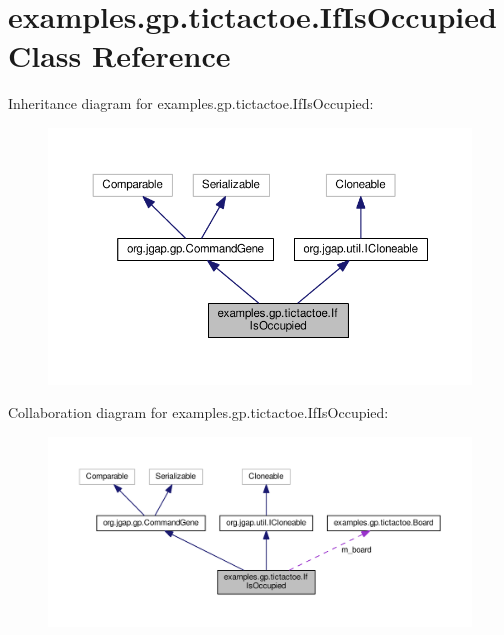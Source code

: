 \hypertarget{classexamples_1_1gp_1_1tictactoe_1_1_if_is_occupied}{\section{examples.\-gp.\-tictactoe.\-If\-Is\-Occupied Class Reference}
\label{classexamples_1_1gp_1_1tictactoe_1_1_if_is_occupied}
}


Inheritance diagram for examples.\-gp.\-tictactoe.\-If\-Is\-Occupied\-:
\nopagebreak
\begin{figure}[H]
\begin{center}
\leavevmode
\includegraphics[width=350pt]{classexamples_1_1gp_1_1tictactoe_1_1_if_is_occupied__inherit__graph}
\end{center}
\end{figure}


Collaboration diagram for examples.\-gp.\-tictactoe.\-If\-Is\-Occupied\-:
\nopagebreak
\begin{figure}[H]
\begin{center}
\leavevmode
\includegraphics[width=350pt]{classexamples_1_1gp_1_1tictactoe_1_1_if_is_occupied__coll__graph}
\end{center}
\end{figure}
